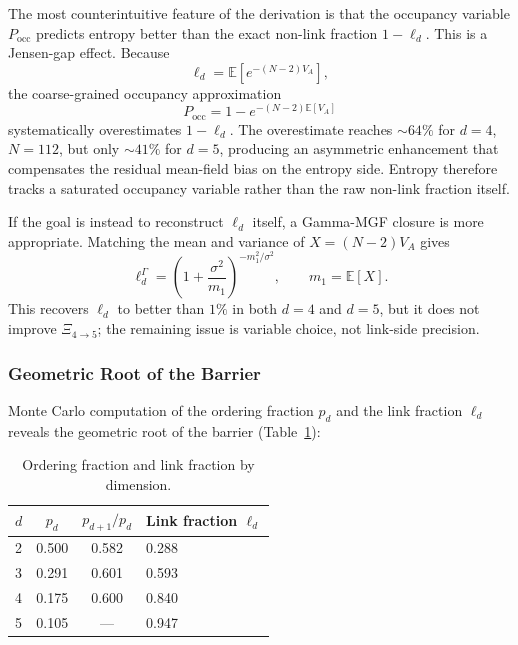 \documentclass[12pt,a4paper]{article}
\begin{document}
The most counterintuitive feature of the derivation is that the occupancy variable
$P_{\mathrm{occ}}$ predicts entropy better than the exact non-link fraction $1-\ell_d$.
This is a Jensen-gap effect. Because
\begin{equation}
\ell_d = \mathbb{E}\!\left[e^{-(N-2)V_A}\right],
\end{equation}
the coarse-grained occupancy approximation
\begin{equation}
P_{\mathrm{occ}} = 1 - e^{-(N-2)\mathbb{E}[V_A]}
\end{equation}
systematically overestimates $1-\ell_d$. The overestimate reaches $\sim 64\%$
for $d=4$, $N=112$, but only $\sim 41\%$ for $d=5$, producing an asymmetric
enhancement that compensates the residual mean-field bias on the entropy side.
Entropy therefore tracks a saturated occupancy variable rather than the raw
non-link fraction itself.

If the goal is instead to reconstruct $\ell_d$ itself, a Gamma-MGF closure
is more appropriate. Matching the mean and variance of
$X=(N-2)V_A$ gives
\begin{equation}
\ell_d^{\Gamma}
=
\left(1+\frac{\sigma^2}{m_1}\right)^{-m_1^2/\sigma^2},
\qquad
m_1 = \mathbb{E}[X].
\end{equation}
This recovers $\ell_d$ to better than $1\%$ in both $d=4$ and $d=5$, but it does
not improve $\Xi_{4\to5}$; the remaining issue is variable choice, not link-side
precision.

\subsubsection{Geometric Root of the Barrier}
\label{sec:ordering_fraction_table}

Monte Carlo computation of the ordering fraction $p_d$ and the link fraction $\ell_d$
reveals the geometric root of the barrier (Table~\ref{tab:ordering_fraction}):

\begin{table}[htbp]
\centering
\caption{Ordering fraction and link fraction by dimension.}
\label{tab:ordering_fraction}
\begin{tabular}{@{}lccl@{}}
\toprule
$d$ & $p_d$ & $p_{d+1}/p_d$ & Link fraction $\ell_d$ \\
\midrule
2 & 0.500 & 0.582 & 0.288 \\
3 & 0.291 & 0.601 & 0.593 \\
4 & 0.175 & 0.600 & 0.840 \\
5 & 0.105 & --- & 0.947 \\
\bottomrule
\end{tabular}
\end{table}
\end{document}
